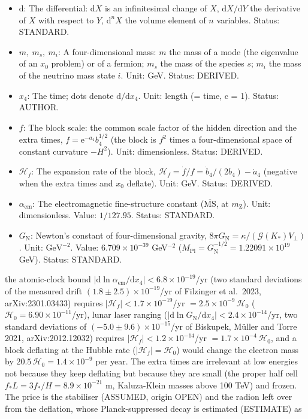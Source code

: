 \documentclass[
  10pt,
]{article}
\providecommand{\tightlist}{%
  \setlength{\itemsep}{0pt}\setlength{\parskip}{0pt}}
\begin{document}
\begin{itemize}
\tightlist
\item
  \(\mathrm{d}\): The differential: \(\mathrm{d}X\) is an infinitesimal
  change of \(X\), \(\mathrm{d}X/\mathrm{d}Y\) the derivative of \(X\)
  with respect to \(Y\), \(\mathrm{d}^nX\) the volume element of \(n\)
  variables. Status: STANDARD.
\item
  \(m,\ m_s,\ m_i\): A four-dimensional mass: \(m\) the mass of a mode
  (the eigenvalue of an \(x_0\) problem) or of a fermion; \(m_s\) the
  mass of the species \(s\); \(m_i\) the mass of the neutrino mass state
  \(i\). Unit: GeV. Status: DERIVED.
\item
  \(x_4\): The time; dots denote \(\mathrm{d}/\mathrm{d}x_4\). Unit:
  length (= time, c = 1). Status: AUTHOR.
\item
  \(f\): The block scale: the common scale factor of the hidden
  direction and the extra times, \(f = \mathrm{e}^{-a_4}b_4^{1/2}\) (the
  block is \(f^2\) times a four-dimensional space of constant curvature
  \(-H^2\)). Unit: dimensionless. Status: DERIVED.
\item
  \(\mathcal{H}_f\): The expansion rate of the block,
  \(\mathcal{H}_f = \dot f/f = \dot b_4/(2b_4) - \dot a_4\) (negative
  when the extra times and \(x_0\) deflate). Unit: GeV. Status: DERIVED.
\item
  \(\alpha_{\mathrm{em}}\): The electromagnetic fine-structure constant
  (\(\overline{\mathrm{MS}}\), at \(m_{\mathrm{Z}}\)). Unit:
  dimensionless. Value: \(1/127.95\). Status: STANDARD.
\item
  \(G_{\mathrm{N}}\): Newton's constant of four-dimensional gravity,
  \(8\pi G_{\mathrm{N}} = \kappa/(\mathcal{G}(K_*)V_\perp)\). Unit:
  \(\mathrm{GeV}^{-2}\). Value: \(6.709\times10^{-39}\) GeV\(^{-2}\)
  (\(M_{\mathrm{Pl}} = G_{\mathrm{N}}^{-1/2} = 1.22091\times10^{19}\)
  GeV). Status: STANDARD.
\end{itemize}

the atomic-clock bound
\(\lvert\mathrm{d}\ln\alpha_{\mathrm{em}}/\mathrm{d}x_4\rvert < 6.8\times10^{-19}\)/yr
(two standard deviations of the measured drift
\((1.8 \pm 2.5)\times10^{-19}\)/yr of Filzinger et al.~2023,
arXiv:2301.03433) requires
\(\lvert\mathcal{H}_f\rvert < 1.7\times10^{-19}\)/yr
\(= 2.5\times10^{-9}\,\mathcal{H}_0\)
(\(\mathcal{H}_0 = 6.90\times10^{-11}\)/yr), lunar laser ranging
(\(\lvert\mathrm{d}\ln G_{\mathrm{N}}/\mathrm{d}x_4\rvert < 2.4\times10^{-14}\)/yr,
two standard deviations of \((-5.0 \pm 9.6)\times10^{-15}\)/yr of
Biskupek, Müller and Torre 2021, arXiv:2012.12032) requires
\(\lvert\mathcal{H}_f\rvert < 1.2\times10^{-14}\)/yr
\(= 1.7\times10^{-4}\,\mathcal{H}_0\), and a block deflating at the
Hubble rate (\(\lvert\mathcal{H}_f\rvert = \mathcal{H}_0\)) would change
the electron mass by \(20.5\,\mathcal{H}_0 = 1.4\times10^{-9}\) per
year. The extra times are irrelevant at low energies not because they
keep deflating but because they are small (the proper half cell
\(f_*L = 3f_*/H = 8.9\times10^{-21}\) m, Kaluza-Klein masses above 100
TeV) and frozen. The price is the stabiliser (ASSUMED, origin OPEN) and
the radion left over from the deflation, whose Planck-suppressed decay
is estimated (ESTIMATE) as
\end{document}
